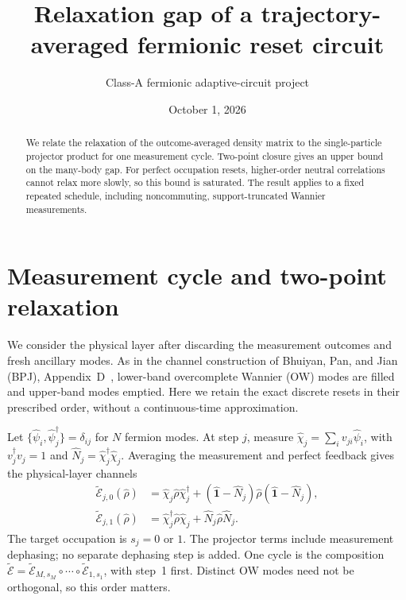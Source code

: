 \documentclass[aps,prb,twocolumn,10pt,raggedbottom,nofootinbib,superscriptaddress]{revtex4-2}
\newcommand{\Id}{\hat{\mathbf{1}}}
\newcommand{\E}{\widetilde{\mathcal E}}
\begin{document}
\title{Relaxation gap of a trajectory-averaged fermionic reset circuit}
\author{Class-A fermionic adaptive-circuit project}
\noaffiliation
\date{October 1, 2026}
\begin{abstract}
We relate the relaxation of the outcome-averaged density matrix to the
single-particle projector product for one measurement cycle. Two-point
closure gives an upper bound on the many-body gap. For perfect occupation
resets, higher-order neutral correlations cannot relax more slowly, so
this bound is saturated. The result applies to a fixed repeated schedule,
including noncommuting, support-truncated Wannier measurements.
\end{abstract}
\maketitle
\setcounter{tocdepth}{1}
\tableofcontents

\section{Measurement cycle and two-point relaxation}
We consider the physical layer after discarding the measurement outcomes
and fresh ancillary modes. As in the channel construction of Bhuiyan,
Pan, and Jian (BPJ), Appendix~D~\cite{BPJ}, lower-band overcomplete
Wannier (OW) modes are filled and upper-band modes emptied. Here we
retain the exact discrete resets in their prescribed order, without a
continuous-time approximation.

Let $\{\hat\psi_i,\hat\psi_j^\dagger\}=\delta_{ij}$ for $N$ fermion
modes. At step $j$, measure $\hat\chi_j=\sum_i v_{ji}\hat\psi_i$,
with $v_j^\dagger v_j=1$ and
$\hat N_j=\hat\chi_j^\dagger\hat\chi_j$. Averaging the measurement
and perfect feedback gives the physical-layer channels
\begin{align}
 \E_{j,0}(\hat\rho)&=\hat\chi_j\hat\rho\hat\chi_j^\dagger
 +(\Id-\hat N_j)\hat\rho(\Id-\hat N_j),\nonumber\\
 \E_{j,1}(\hat\rho)&=\hat\chi_j^\dagger\hat\rho\hat\chi_j
 +\hat N_j\hat\rho\hat N_j. \label{eq:reset}
\end{align}
The target occupation is $s_j=0$ or $1$. The projector terms include
measurement dephasing; no separate dephasing step is added. One cycle
is the composition $\E=\E_{M,s_M}\circ\cdots\circ\E_{1,s_1}$,
with step~1 first. Distinct OW modes need not be orthogonal, so this
order matters.
\end{document}
